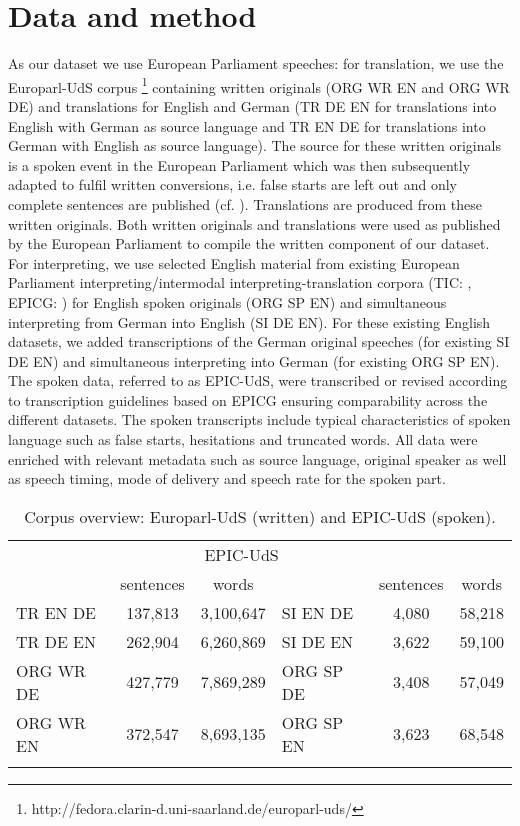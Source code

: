 \documentclass[output=paper,colorlinks,citecolor=brown]{langscibook}
\begin{document}
\section{Data and method}\label{data}
As our dataset we use European Parliament speeches: for translation, we use the Europarl-UdS corpus \citep{Karakanta2018}\footnote{ http://fedora.clarin-d.uni-saarland.de/europarl-uds/} containing written originals (ORG WR EN and ORG WR DE) and translations for English and German (TR DE EN for translations into English with German as source language and TR EN DE for translations into German with English as source language). The source for these written originals is a spoken event in the European Parliament which was then subsequently adapted to fulfil written conversions, i.e. false starts are left out and only complete sentences are published (cf. \cite{BernardiniEtAl2016}). Translations are produced from these written originals. Both written originals and translations were used as published by the European Parliament to compile the written component of our dataset. For interpreting, we use selected English material from existing European Parliament interpreting/intermodal interpreting-translation corpora (TIC: \cite{KajzerWietrzny2012}, EPICG: \cite{DefrancqEtAl2015}) for English spoken originals (ORG SP EN) and simultaneous interpreting from German into English (SI DE EN). For these existing English datasets, we added transcriptions of the German original speeches (for existing SI DE EN) and simultaneous interpreting into German (for existing ORG SP EN). The spoken data, referred to as EPIC-UdS, were transcribed or revised according to transcription guidelines based on EPICG \citep{BernardiniEtAl2018} ensuring comparability across the different datasets. The spoken transcripts include typical characteristics of spoken language such as false starts, hesitations and truncated words.
All data were enriched with relevant metadata such as source language, original speaker as well as speech timing, mode of delivery and speech rate for the spoken part. 


\begin{table}
\begin{tabular}{lcclcc} \lsptoprule
  \multicolumn{3}{c}{Europarl-UdS} & \multicolumn{3}{c}{EPIC-UdS}\\ \cmidrule(lr){1-3} \cmidrule(lr){4-6}
 & sentences & words &  & sentences & words \\ \midrule

TR EN DE & 137,813 & 3,100,647 & SI EN DE & 4,080 & 58,218 \\
TR DE EN & 262,904 & 6,260,869 & SI DE EN & 3,622 & 59,100 \\
ORG WR DE & 427,779 & 7,869,289  & ORG SP DE  & 3,408 & 57,049 \\
ORG WR EN & 372,547 & 8,693,135 & ORG SP EN & 3,623 & 68,548 \\\lspbottomrule
\end{tabular}
\caption{\label{tab:Corpus_overview} Corpus overview: Europarl-UdS (written) and EPIC-UdS (spoken).}
\end{table}
\end{document}
